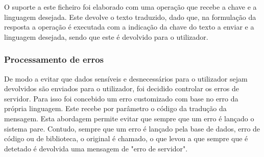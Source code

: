 O suporte a este ficheiro foi elaborado com uma operação que recebe a chave e a linguagem desejada. Este devolve o texto traduzido, dado que, na formulação da resposta a operação é executada com a indicação da chave do texto a enviar e a linguagem desejada, sendo que este é devolvido para o utilizador.

\subsubsection{Processamento de erros}
De modo a evitar que dados sensíveis e desnecessários para o utilizador sejam devolvidos são enviados para o utilizador, foi decidido controlar os erros de servidor. Para isso foi concebido um erro customizado com base no erro da própria linguagem. Este recebe por parâmetro o código da tradução da mensagem. Esta abordagem permite evitar que sempre que um erro é lançado o sistema pare. Contudo, sempre que um erro é lançado pela base de dados, erro de código ou de biblioteca, o original é chamado, o que levou a que sempre que é detetado é devolvida uma mensagem de "erro de servidor".